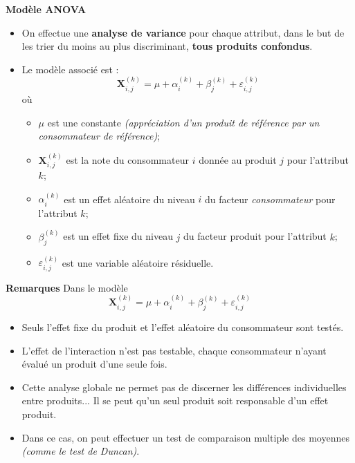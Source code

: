 \documentclass[aspectratio=169,xcolor=dvipsnames]{beamer}
\begin{document}
\begin{frame}
	\begin{block}{\textbf{Modèle ANOVA}}
		\begin{itemize}
		\item On effectue une \textbf{analyse de variance} pour chaque attribut, dans le but de les trier du moins au plus discriminant, \textbf{tous produits confondus}.
		\item Le modèle associé est :
			\[
			\mathbf{X}_{i,j}^{(k)} = \mu + \alpha_i^{(k)} + \beta_j^{(k)} + \varepsilon_{i,j}^{(k)}
			\]
		où
			\begin{itemize}
			\item $\mu$ est une constante \emph{(appréciation d'un produit de référence par un consommateur de référence)};
			\item $\mathbf{X}_{i,j}^{(k)}$ est la note du consommateur $i$ donnée au produit $j$ pour l'attribut $k$;
			\item $\alpha_i^{(k)}$ est un effet aléatoire du niveau $i$ du facteur \emph{consommateur} pour l'attribut $k$;
			\item $\beta_j^{(k)}$ est un effet fixe du niveau $j$ du facteur produit pour l'attribut $k$;
			\item $\varepsilon_{i,j}^{(k)}$ est une variable aléatoire résiduelle.
			\end{itemize}
		\end{itemize}
		
	\end{block}
\end{frame}

\begin{frame}
	\begin{exampleblock}{\textbf{Remarques}}
	Dans le modèle 
		\[
		\mathbf{X}_{i,j}^{(k)} = \mu + \alpha_i^{(k)} + \beta_j^{(k)} + \varepsilon_{i,j}^{(k)}
		\]
		\begin{itemize}
		\item[\faCogs] Seuls l'effet fixe du produit et l'effet aléatoire du consommateur sont testés.
		
		\item[\faLightbulb] L'effet de l'interaction n'est pas testable, chaque consommateur n'ayant évalué un produit d'une seule fois.
		
		\item[\faCogs] Cette analyse globale ne permet pas de discerner les différences individuelles entre produits... Il se peut qu'un seul produit soit responsable d'un effet produit.
		
		\item[\faLightbulb] Dans ce cas, on peut effectuer un test de comparaison multiple des moyennes \emph{(comme le test de Duncan)}.
		\end{itemize}
	\end{exampleblock}
\end{frame}
\end{document}
